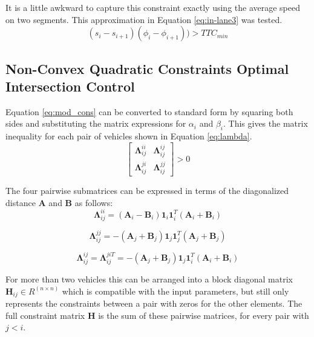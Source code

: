 It is a little awkward to capture this constraint exactly using the average speed on two segments. This approximation in Equation \ref{eq:in-lane3} was tested.
\begin{equation}
	(s_{i}-s_{i+1})(\phi_i - \phi_{i+1})) > TTC_{min}
	\label{eq:in-lane3}
\end{equation}  
\subsection{Non-Convex Quadratic Constraints Optimal Intersection Control}
\label{sec:quad}
Equation \ref{eq:mod_cons} can be converted to standard form by squaring both sides and substituting the matrix expressions for $\alpha_i$ and $\beta_i$. This gives the matrix inequality for each pair of vehicles shown in Equation \ref{eq:lambda}.
\begin{equation}
	[\bm{\phi}_i^T, \bm{\phi}_j^T] \left[\begin{array}{cc}
		\bm{\Lambda}_{ij}^{ii} & \bm{\Lambda}_{ij}^{ij} \\
		\bm{\Lambda}_{ij}^{ji} & \bm{\Lambda}_{ij}^{jj}
	\end{array}\right] > 0
	\label{eq:lambda}
\end{equation}

The four pairwise submatrices can be expressed in terms of the diagonalized distance $\bm{A}$ and $\bm{B}$ as follows:
\begin{equation}
	\bm{\Lambda}_{ij}^{ii} =  (\bm{A}_i - \bm{B}_i)\bm{1}_i\bm{1}_i^T(\bm{A}_i + \bm{B}_i)
\end{equation}

\begin{equation}
	\bm{\Lambda}_{ij}^{jj} =  - (\bm{A}_j + \bm{B}_j)\bm{1}_j\bm{1}_j^T(\bm{A}_j + \bm{B}_j)
\end{equation}

\begin{equation}
	\bm{\Lambda}_{ij}^{ij} = \bm{\Lambda}_{ij}^{ji T}  =  - (\bm{A}_j + \bm{B}_j)\bm{1}_j\bm{1}_i^T(\bm{A}_i + \bm{B}_i)
\end{equation}

For more than two vehicles this can be arranged into a
block diagonal matrix $\bm{H}_{ij} \in R^{(n \times n)}$ which is compatible with the input parameters, but still only represents the constraints between a pair with zeros for the other elements. The full constraint matrix $\bm{H}$ is the sum of these pairwise matrices, for every pair with $j<i$. 










